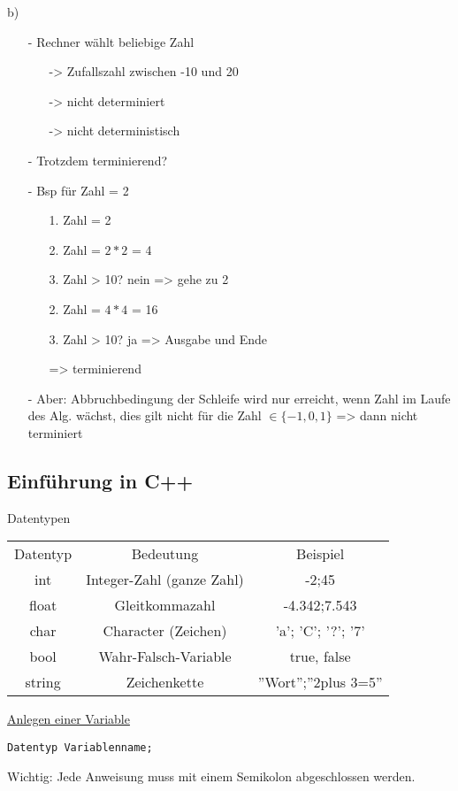 b) \begin{itemize}
 \item[-] Rechner wählt beliebige Zahl
  \begin{itemize}
   \item[->] Zufallszahl zwischen -10 und 20
   \item[->] nicht determiniert
   \item[->] nicht deterministisch
  \end{itemize}
  \item[-] Trotzdem terminierend?
  \item[-] Bsp für Zahl = 2
  \begin{itemize}
   \item[1.] Zahl = 2
   \item[2.] Zahl = $2*2$ = 4
   \item[3.] Zahl > 10? nein => gehe zu 2
   \item[2.] Zahl = $4*4$ = 16
   \item[3.] Zahl > 10? ja => Ausgabe und Ende
   \item[=>] terminierend
  \end{itemize}
  \item[-] Aber: Abbruchbedingung der Schleife wird nur erreicht, wenn Zahl im Laufe des Alg. wächst, dies gilt nicht für die Zahl $\in \{-1,0,1\}$ => dann nicht terminiert
\end{itemize}

\subsection{Einführung in C++}
Datentypen \\
\begin{table}[h]
\begin{tabular}{c|c|c}
	Datentyp & Bedeutung & Beispiel \\
	int & Integer-Zahl (ganze Zahl) & -2;45 \\
	float & Gleitkommazahl & -4.342;7.543 \\
	char & Character (Zeichen) & 'a'; 'C'; '?'; '7' \\
	bool & \glq Wahr-Falsch-Variable \grq & true, false \\
	string & Zeichenkette & ''Wort'';''2plus 3=5'' \\
\end{tabular}
\end{table}
\underline{Anlegen einer Variable} \\
\begin{lstlisting}
Datentyp Variablenname;
\end{lstlisting}
Wichtig: Jede Anweisung muss mit einem Semikolon abgeschlossen werden.

